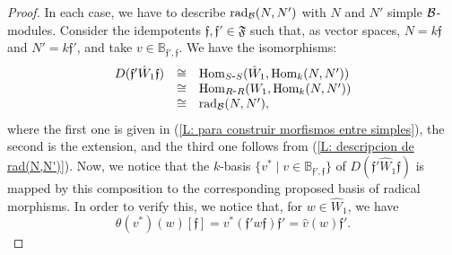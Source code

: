 \documentclass{article}
\theoremstyle{definition}
\newcommand{\Hom}{{ \rm Hom }}
\newcommand{\rad}{{ \rm rad }}
\renewcommand{\frak}{\mathfrak}
\newcommand{\g}{\hbox{-}}
\newcommand{\hueca}[1]{\mathbb{#1}}
\begin{document}
\begin{proof}  In each case, we have to describe $\rad_{\cal B}(N,N')$ with $N$ and $N'$ simple ${\cal B}$-modules. Consider the idempotents $\frak{f}, \frak{f}'\in \frak{F}$ such that, as vector spaces,  $N=k\frak{f}$ and $N'=k\frak{f}'$, and take $v\in \hueca{B}_{\frak{f}',\frak{f}}$.  We have the isomorphisms:
$$\begin{matrix}
D(\frak{f}'\hat{W}_1\frak{f})
&\cong &
\Hom_{S\g S}(\hat{W}_1,\Hom_k(N,N'))\hfill\\
&\cong&
\Hom_{R\g R}(W_1,\Hom_k(N,N'))\hfill\\
&\cong&
\rad_{\cal B}(N,N'),
\hfill\\
\end{matrix}$$
where the first one is given in (\ref{L: para construir morfismos entre simples}), the second  is the extension, and the third one follows from (\ref{L: descripcion de rad(N,N')}). Now, we notice that the $k$-basis $\{v^*\mid v\in \hueca{B}_{\frak{f}',\frak{f}}\}$ of $D(\frak{f}'\hat{W}_1\frak{f})$ is mapped by this composition to the corresponding proposed basis of radical morphisms. In order to verify this, we  notice that, for $w\in \hat{W}_1$, we have  
$$\theta(v^*)(w)[\frak{f}]=v^*(\frak{f}'w\frak{f})\frak{f}'=\hat{v}(w)\frak{f}'.$$
\end{proof}
\end{document}
